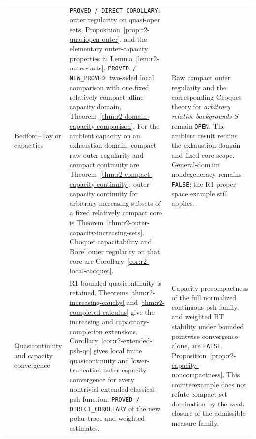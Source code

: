 \begin{longtable}{@{}>{\raggedright\arraybackslash}p{}>{\raggedright\arraybackslash}p{}>{\raggedright\arraybackslash}p{}>{\raggedright\arraybackslash}p{}@{}}
6 & Bedford--Taylor capacities &
\texttt{PROVED / DIRECT\_COROLLARY}: outer regularity on quasi-open
sets, Proposition~\ref{prop:r2-quasiopen-outer}, and the elementary
outer-capacity properties in Lemma~\ref{lem:r2-outer-facts}.
\texttt{PROVED / NEW\_PROVED}: two-sided local comparison with one
fixed relatively compact affine capacity domain,
Theorem~\ref{thm:r2-domain-capacity-comparison}. For the ambient
capacity on an exhaustion domain, compact raw outer regularity and
compact continuity are Theorem~\ref{thm:r2-compact-capacity-continuity};
outer-capacity continuity for arbitrary increasing subsets of a
fixed relatively compact core is
Theorem~\ref{thm:r2-outer-capacity-increasing-sets}.
Choquet capacitability and Borel outer regularity on that core are
Corollary~\ref{cor:r2-local-choquet}. &
Raw compact outer regularity and the corresponding Choquet theory
for \emph{arbitrary relative backgrounds $S$} remain \texttt{OPEN}.
The ambient result retains the exhaustion-domain and fixed-core
scope. General-domain nondegeneracy remains \texttt{FALSE}; the R1
proper-space example still applies.\\[5pt]

7 & Quasicontinuity and capacity convergence &
R1 bounded quasicontinuity is retained. Theorems
\ref{thm:r2-increasing-cauchy} and \ref{thm:r2-completed-calculus}
give the increasing and capacitary-completion extensions.
Corollary~\ref{cor:r2-extended-psh-qc} gives local finite
quasicontinuity and lower-truncation outer-capacity convergence for
every nontrivial extended classical psh function:
\texttt{PROVED / DIRECT\_COROLLARY} of the new polar-trace and
weighted estimates. &
Capacity precompactness of the full normalized continuous psh family,
and weighted BT stability under bounded pointwise convergence alone,
are \texttt{FALSE},
Proposition~\ref{prop:r2-capacity-noncompactness}. This counterexample
does not refute compact-set domination by the weak closure of the
admissible measure family.\\[5pt]


\end{longtable}
